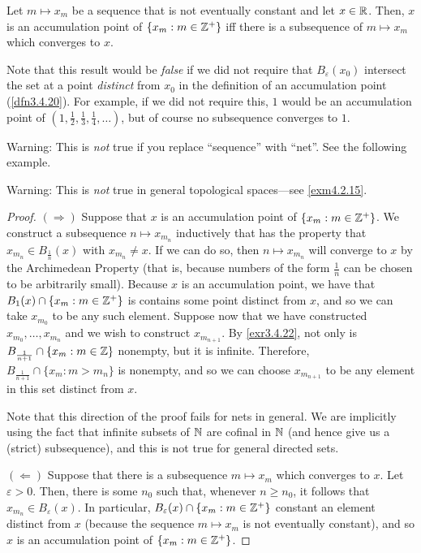 \begin{prp}\label{prp3.4.27}
Let $m\mapsto x_m$ be a sequence that is not eventually constant and let $x\in \mathbb{R}$.  Then, $x$ is an accumulation point of $\{ x_m :m\in \mathbb{Z} ^+\}$ iff there is a subsequence of $m\mapsto x_m$ which converges to $x$.
\begin{rmk}
Note that this result would be \emph{false} if we did not require that $B_\varepsilon (x_0)$ intersect the set at a point \emph{distinct} from $x_0$ in the definition of an accumulation point (\cref{dfn3.4.20}).  For example, if we did not require this, $1$ would be an accumulation point of $(1,\frac{1}{2},\frac{1}{3},\frac{1}{4},\ldots )$, but of course no subsequence converges to $1$.
\end{rmk}
\begin{rmk}
Warning:  This is \emph{not} true if you replace ``sequence'' with ``net''.  See the following example.
\end{rmk}
\begin{rmk}
Warning:  This is \emph{not} true in general topological spaces---see \cref{exm4.2.15}.
\end{rmk}
\begin{proof}
$(\Rightarrow )$ Suppose that $x$ is an accumulation point of $\{ x_m :m\in \mathbb{Z} ^+\}$.  We construct a subsequence $n\mapsto x_{m_n}$ inductively that has the property that $x_{m_n}\in B_{\frac{1}{n}}(x)$ with $x_{m_n}\neq x$.  If we can do so, then $n\mapsto x_{m_n}$ will converge to $x$ by the Archimedean Property (that is, because numbers of the form $\frac{1}{n}$ can be chosen to be arbitrarily small).  Because $x$ is an accumulation point, we have that $B_1(x)\cap \{ x_m:m\in \mathbb{Z} ^+\}$ is contains some point distinct from $x$, and so we can take $x_{m_0}$ to be any such element.  Suppose now that we have constructed $x_{m_0},\ldots ,x_{m_n}$ and we wish to construct $x_{m_{n+1}}$.  By \cref{exr3.4.22}, not only is $B_{\frac{1}{n+1}}\cap \{ x_m:m\in \mathbb{Z} \}$ nonempty, but it is infinite.  Therefore, $B_{\frac{1}{n+1}}\cap \{ x_m:m>m_n\}$ is nonempty, and so we can choose $x_{m_{n+1}}$ to be any element in this set distinct from $x$.
\begin{rmk}
Note that this direction of the proof fails for nets in general.  We are implicitly using the fact that infinite subsets of $\mathbb{N}$ are cofinal in $\mathbb{N}$ (and hence give us a (strict) subsequence), and this is not true for general directed sets.
\end{rmk}

\blankline
\noindent
$(\Leftarrow )$ Suppose that there is a subsequence $m\mapsto x_m$ which converges to $x$.  Let $\varepsilon >0$.  Then, there is some $n_0$ such that, whenever $n\geq n_0$, it follows that $x_{m_n}\in B_\varepsilon (x)$.  In particular, $B_\varepsilon (x)\cap \{ x_m:m\in \mathbb{Z} ^+\}$ constant an element distinct from $x$ (because the sequence $m\mapsto x_m$ is not eventually constant), and so $x$ is an accumulation point of $\{ x_m:m\in \mathbb{Z} ^+\}$.
\end{proof}
\end{prp}
